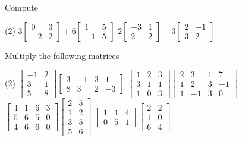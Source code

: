 \begin{exercise}
Compute
\begin{tasks}(2)
\task
$3\begin{bmatrix}
0 & 3 \\
-2 & 2
\end{bmatrix}
+
6
\begin{bmatrix}
1 & 5 \\
-1 & 5
\end{bmatrix}$
\task
$2\begin{bmatrix}
-3 & 1 \\
2 & 2
\end{bmatrix}
-
3
\begin{bmatrix}
2 & -1 \\
3 & 2
\end{bmatrix}$
\end{tasks}
\end{exercise}

\begin{exercise}
Multiply the following matrices
\begin{tasks}(2)
\task
$\begin{bmatrix}
-1 & 2 \\
3 & 1 \\
5 & 8
\end{bmatrix}
\begin{bmatrix}
3 & -1 & 3 & 1 \\
8 & 3 & 2 & -3
\end{bmatrix}$
\task
$\begin{bmatrix}
1 & 2 & 3 \\
3 & 1 & 1 \\
1 & 0 & 3
\end{bmatrix}
\begin{bmatrix}
2 & 3 & 1 & 7 \\
1 & 2 & 3 & -1 \\
1 & -1 & 3 & 0
\end{bmatrix}$
\task
$\begin{bmatrix}
4 & 1 & 6 & 3 \\
5 & 6 & 5 & 0 \\
4 & 6 & 6 & 0
\end{bmatrix}
\begin{bmatrix}
2 & 5 \\
1 & 2 \\
3 & 5 \\
5 & 6
\end{bmatrix}$
\task
$\begin{bmatrix}
1 & 1 & 4 \\
0 & 5 & 1
\end{bmatrix}
\begin{bmatrix}
2 & 2 \\
1 & 0 \\
6 & 4
\end{bmatrix}$
\end{tasks}
\end{exercise}


